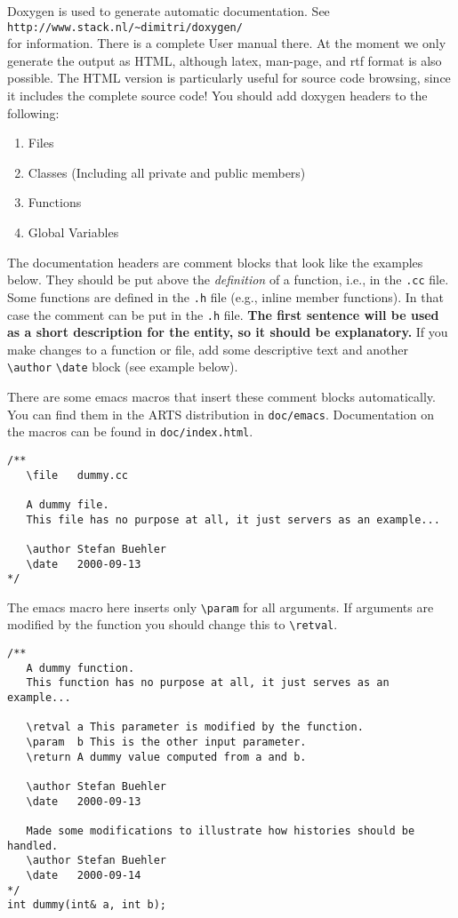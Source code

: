 Doxygen is used to generate automatic documentation. See\\
\verb|http://www.stack.nl/~dimitri/doxygen/|\\ for information. There
is a complete User manual there. At the moment we only generate the
output as HTML, although latex, man-page, and rtf format is also
possible. The HTML version is particularly useful for source code
browsing, since it includes the complete source code! You should add
doxygen headers to the following:

\begin{enumerate}
\item Files
\item Classes (Including all private and public members)
\item Functions
\item Global Variables
\end{enumerate}

The documentation headers are comment blocks that look like the
examples below. They should be put above the \emph{definition} of a
function, i.e., in the \verb|.cc| file.  Some functions are defined in
the \verb|.h| file (e.g., inline member functions). In that case the
comment can be put in the \verb|.h| file.  \textbf{The first sentence
  will be used as a short description for the entity, so it should be
  explanatory.}  If you make changes to a function or file, add some
descriptive text and another \verb|\author| \verb|\date| block (see
example below).

There are some emacs macros that insert these comment blocks
automatically. You can find them in the ARTS distribution in
\verb|doc/emacs|. Documentation on the macros can be found in
\verb|doc/index.html|. 

\begin{verbatim}
/**
   \file   dummy.cc

   A dummy file.
   This file has no purpose at all, it just servers as an example... 
  
   \author Stefan Buehler
   \date   2000-09-13
*/    
\end{verbatim}


The emacs macro here inserts only \verb|\param| for all
arguments. If arguments are modified by the function you should
change this to \verb|\retval|.

\begin{verbatim}
/** 
   A dummy function.
   This function has no purpose at all, it just serves as an example...

   \retval a This parameter is modified by the function.
   \param  b This is the other input parameter.
   \return A dummy value computed from a and b.

   \author Stefan Buehler
   \date   2000-09-13

   Made some modifications to illustrate how histories should be handled.
   \author Stefan Buehler
   \date   2000-09-14
*/
int dummy(int& a, int b);
\end{verbatim}




